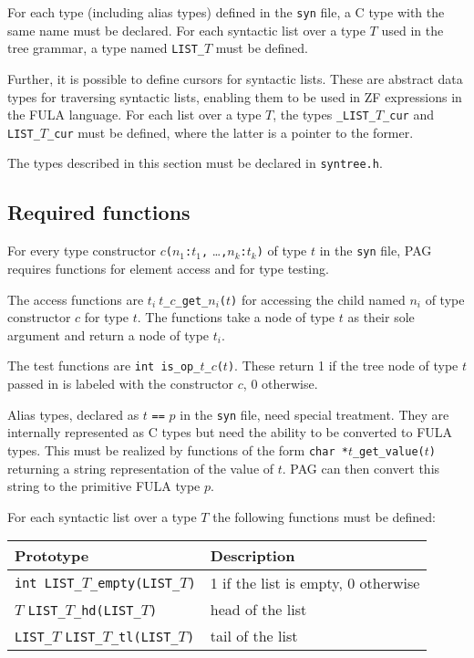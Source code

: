 \documentclass[12pt]{article}
\begin{document}
For each type (including alias types) defined in the \verb|syn|
file, a C type with the same name must be declared. For each
syntactic list over a type \(T\) used in the tree grammar, a type
named \verb|LIST_|\(T\) must be defined.

Further, it is possible to define cursors for syntactic lists. These
are abstract data types for traversing syntactic lists, enabling
them to be used in ZF expressions in the FULA language. For
each list over a type \(T\), the types \verb|_LIST_|\(T\)\verb|_cur|
and \verb|LIST_|\(T\)\verb|_cur| must be defined, where the latter
is a pointer to the former.

The types described in this section must be declared in
\verb|syntree.h|.

\subsection{Required functions}

For every type constructor \(c\)\verb|(|\(n_1\)\verb|:|\(t_1\)\verb|,|
\ldots\verb|,|\(n_k\)\verb|:|\(t_k\)\verb|)| of type \(t\) in the
\verb|syn| file, PAG requires functions for element access and for
type testing.

The access functions are
\(t_i\ t\)\verb|_|\(c\)\verb|_get_|\(n_i\)\verb|(|\(t\)\verb|)| for
accessing the child named \(n_i\) of type constructor \(c\) for type
\(t\). The functions take a node of type \(t\) as their sole
argument and return a node of type \(t_i\).

The test functions are
\verb|int is_op_|\(t\)\verb|_|\(c\)\verb|(|\(t\)\verb|)|. These
return 1 if the tree node of type \(t\) passed in is labeled with
the constructor \(c\), 0 otherwise.

Alias types, declared as \(t\) \verb|==| \(p\) in the \verb|syn|
file, need special treatment. They are internally represented as C
types but need the ability to be converted to FULA types. This must
be realized by functions of the form
\verb|char *|\(t\)\verb|_get_value(|\(t\)\verb|)| returning a string
representation of the value of \(t\). PAG can then convert this
string to the primitive FULA type \(p\).

For each syntactic list over a type \(T\) the following functions
must be defined:

\begin{longtable}{|p{} | p{}|}
\hline
Prototype & Description \\
\hline
\hline \endhead
\verb|int LIST_|\(T\)\verb|_empty(LIST_|\(T\)\verb|)|
    & 1 if the list is empty, 0 otherwise \\
\hline
\(T\) \verb|LIST_|\(T\)\verb|_hd(LIST_|\(T\)\verb|)|
    & head of the list \\
\hline
\verb|LIST_|\(T\) \verb|LIST_|\(T\)\verb|_tl(LIST_|\(T\)\verb|)|
    & tail of the list \\
\hline
\end{longtable}
\end{document}

